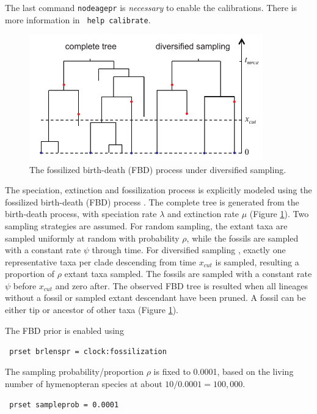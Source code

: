 \documentclass[12pt]{article}
\begin{document}
\noindent The last command {\tt nodeagepr} is {\it necessary} to enable the calibrations.
There is more information in {\tt \color{red} help calibrate}.

\begin{figure}[h]
\includegraphics[width=0.9\textwidth]{figures/fbdtree.pdf}
\caption{The fossilized birth-death (FBD) process under diversified sampling.}
\label{fig_fbdtree}
\end{figure}

The speciation, extinction and fossilization process is explicitly modeled using the fossilized birth-death (FBD) process \citep{Stadler:2010fn,Heath:2014hn,Gavryushkina:2014fw,Zhang:2016kf}.
The complete tree is generated from the birth-death process, with speciation rate $\lambda$ and extinction rate $\mu$ (Figure \ref{fig_fbdtree}). 
Two sampling strategies are assumed. For random sampling, the extant taxa are sampled uniformly at random with probability $\rho$, while the fossils are sampled with a constant rate $\psi$ through time.
For diversified sampling \citep{Zhang:2016kf}, exactly one representative taxa per clade descending from time $x_{cut}$ is sampled, resulting a proportion of $\rho$ extant taxa sampled.
The fossils are sampled with a constant rate $\psi$ before $x_{cut}$ and zero after.
The observed FBD tree is resulted when all lineages without a fossil or sampled extant descendant have been pruned.
A fossil can be either tip or ancestor of other taxa (Figure \ref{fig_fbdtree}).

The FBD prior is enabled using

\medskip
{\tt \color{red} \noindent
prset brlenspr = clock:fossilization
}
\medskip

\noindent The sampling probability/proportion $\rho$ is fixed to 0.0001, based on the living number of hymenopteran species at about $10/0.0001=100,000$.

\medskip
{\tt \color{red} \noindent
prset sampleprob = 0.0001
}
\medskip
\end{document}
